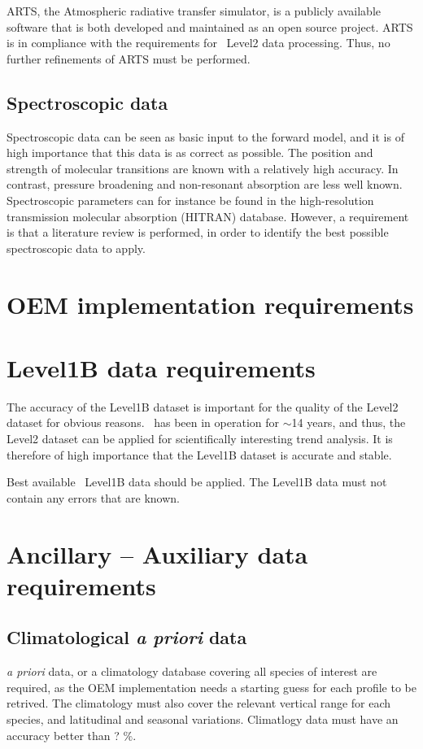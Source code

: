 ARTS, the Atmospheric radiative transfer simulator, 
is a publicly available software that is both developed and 
maintained as an open source project.
ARTS is in compliance with the requirements for \smr\ Level2
data processing. Thus, no further refinements of ARTS must be performed.


\subsection{Spectroscopic data}

Spectroscopic data can be seen as basic input to the forward model,  
and it is of high importance that this data is as correct as possible. 
The position and strength of molecular transitions 
are known with a relatively high accuracy. In contrast, pressure 
broadening and non-resonant absorption are less well known.
Spectroscopic parameters can for instance be found in the 
high-resolution transmission molecular absorption (HITRAN) database.
However, a requirement is that a literature review is performed,
in order to identify the best possible spectroscopic data to apply. 



\section{OEM implementation requirements}


\section{Level1B data requirements}

The accuracy of the Level1B dataset is important for the quality of the
Level2 dataset for obvious reasons. \smr\ has been in operation
for \(\sim\)14 years, and thus, the Level2 dataset can be applied for
scientifically interesting trend analysis. It is therefore of
high importance that the Level1B dataset is accurate and stable.

Best available \smr\ Level1B data should be applied.
The Level1B data must not contain any errors that are known.


\section{Ancillary -- Auxiliary data requirements}
\subsection{Climatological \textit{a priori} data}
\textit{a priori} data, or a climatology database covering all species of interest
are required, as the OEM implementation needs a starting guess for each profile
to be retrived. 
The climatology must also cover the relevant vertical range for each species, and
latitudinal and seasonal variations.
Climatlogy data must have an accuracy better than ? \(\%\).

